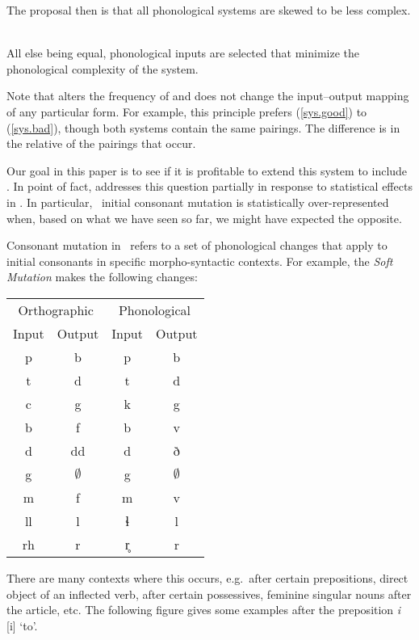 \documentclass[output=paper,
modfonts
]{LSP/langsci}
\begin{document}
The proposal then is that all phonological systems are skewed to be less complex.

\ea
\label{input.opt}
\textbf{\io} \\
All else being equal, phonological inputs are selected that minimize the phonological complexity of the system.
\z

\noindent Note that  \add{(\ref{input.opt})} alters the frequency of  and does not change the input--output mapping of any particular form. For example, this principle prefers (\ref{sys.good}) to (\ref{sys.bad}), though both systems contain the same pairings. The difference is in the relative  of the pairings that occur.

Our goal in this paper is to see if it is profitable to extend this system to include . In point of fact, \citet{inopt.phon} addresses this question partially in response to statistical effects in \w. In particular, \w\ initial consonant mutation is statistically over-represented when, based on what we have seen so far, we might have expected the opposite.

Consonant mutation in \w\ refers to a set of phonological changes that apply to initial consonants in specific morpho-syntactic contexts. For example, the \emph{Soft Mutation} makes the following changes:

\ea
\begin{tabular}[t]{cc|cc}
\multicolumn{2}{c|}{Orthographic} & \multicolumn{2}{c}{Phonological} \\
Input & Output      & Input & Output \\
\hline
p     & b           & p     & b \\
t     & d           & t     & d \\
c     & g           & k     & g \\
b     & f           & b     & v \\
d     & dd          & d     & ð \\
g     & $\emptyset$ & g     & $\emptyset$ \\
m     & f           & m     & v \\
ll    & l           & ɬ     & l \\
rh    & r           & r̥     & r
\end{tabular}
\z

There are many contexts where this occurs, e.g.\ after certain prepositions, direct object of an inflected verb, after certain possessives, feminine singular nouns after the article, etc. The following figure gives some examples after the preposition \emph{i} [i] `to'.
\end{document}
